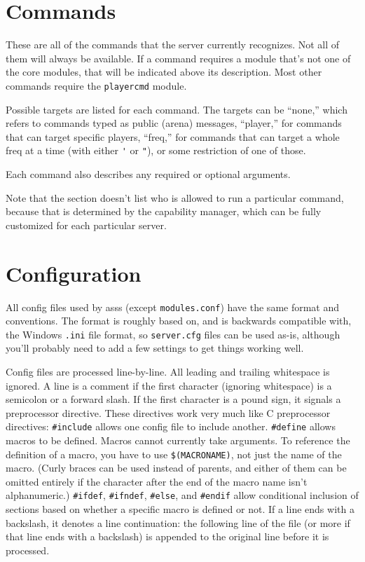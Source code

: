 \documentclass{article}
\newcommand{\asss}{asss}
\begin{document}
\section{Commands}

These are all of the commands that the server currently recognizes. Not
all of them will always be available. If a command requires a module
that's not one of the core modules, that will be indicated above its
description. Most other commands require the \texttt{playercmd} module.

Possible targets are listed for each command. The targets can be
``none,'' which refers to commands typed as public (arena) messages,
``player,'' for commands that can target specific players, ``freq,'' for
commands that can target a whole freq at a time (with either \verb/'/ or
\verb/"/), or some restriction of one of those.

Each command also describes any required or optional arguments.

Note that the section doesn't list who is allowed to run a particular
command, because that is determined by the capability manager, which can
be fully customized for each particular server.




\section{Configuration}

All config files used by \asss{} (except \verb/modules.conf/) have the
same format and conventions. The format is roughly based on, and is
backwards compatible with, the Windows \verb/.ini/ file format, so
\verb/server.cfg/ files can be used as-is, although you'll probably need
to add a few settings to get things working well.

Config files are processed line-by-line. All leading and trailing
whitespace is ignored. A line is a comment if the first character
(ignoring whitespace) is a semicolon or a forward slash. If the first
character is a pound sign, it signals a preprocessor directive. These
directives work very much like C preprocessor directives:
\verb/#include/ allows one config file to include another.
\verb/#define/ allows macros to be defined. Macros cannot currently take
arguments. To reference the definition of a macro, you have to use
\verb/$(MACRONAME)/, not just the name of the macro. (Curly braces can
be used instead of parents, and either of them can be omitted entirely
if the character after the end of the macro name isn't alphanumeric.)
\verb/#ifdef/, \verb/#ifndef/, \verb/#else/, and \verb/#endif/ allow
conditional inclusion of sections based on whether a specific macro is
defined or not. If a line ends with a backslash, it denotes a line
continuation: the following line of the file (or more if that line ends
with a backslash) is appended to the original line before it is
processed.
\end{document}
